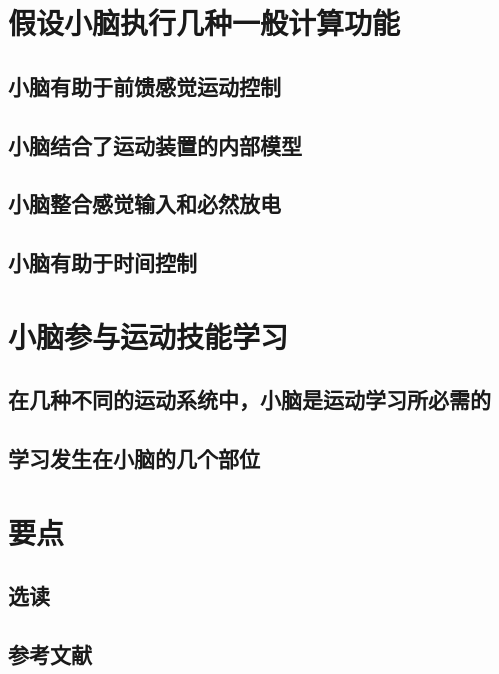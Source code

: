 \section{假设小脑执行几种一般计算功能}
\subsection{小脑有助于前馈感觉运动控制}
\subsection{小脑结合了运动装置的内部模型}
\subsection{小脑整合感觉输入和必然放电}
\subsection{小脑有助于时间控制}

\section{小脑参与运动技能学习}
\subsection{在几种不同的运动系统中，小脑是运动学习所必需的}
\subsection{学习发生在小脑的几个部位}

\section{要点}
\subsection{选读}
\subsection{参考文献}

